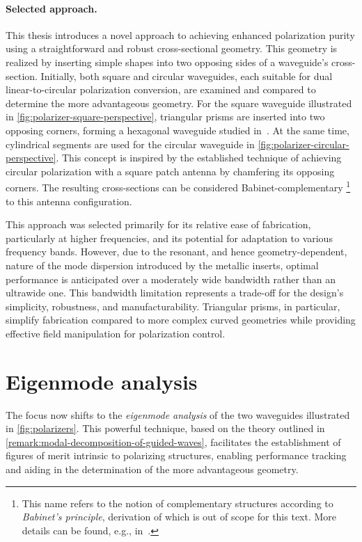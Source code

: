 \documentclass[11pt,a4paper,twoside,openany]{report}
\begin{document}
\paragraph{Selected approach.} This thesis introduces a novel approach to achieving enhanced polarization purity using a straightforward and robust cross-sectional geometry. This geometry is realized by inserting simple shapes into two opposing sides of a waveguide's cross-section. Initially, both square and circular waveguides, each suitable for dual linear-to-circular polarization conversion, are examined and compared to determine the more advantageous geometry. For the square waveguide illustrated in \cref{fig:polarizer-square-perspective}, triangular prisms are inserted into two opposing corners, forming a hexagonal waveguide studied in~\parencite{bhardwaj-volakis:hexagonal-waveguides-new-class-of-waveguides-for-mmwave-circularly-polarized-horns}. At the same time, cylindrical segments are used for the circular waveguide in \cref{fig:polarizer-circular-perspective}. This concept is inspired by the established technique of achieving circular polarization with a square patch antenna by chamfering its opposing corners. The resulting cross-sections can be considered Babinet-complementary%
    \footnote{This name refers to the notion of complementary structures according to \emph{Babinet's principle}, derivation of which is out of scope for this text. More details can be found, e.g., in~\parencite{born-wolf:principles-of-optics}.}
to this antenna configuration.

This approach was selected primarily for its relative ease of fabrication, particularly at higher frequencies, and its potential for adaptation to various frequency bands. However, due to the resonant, and hence geometry-dependent, nature of the mode dispersion introduced by the metallic inserts, optimal performance is anticipated over a moderately wide bandwidth rather than an ultrawide one. This bandwidth limitation represents a trade-off for the design's simplicity, robustness, and manufacturability. Triangular prisms, in particular, simplify fabrication compared to more complex curved geometries while providing effective field manipulation for polarization control.

\section{Eigenmode analysis}
The focus now shifts to the \emph{eigenmode analysis} of the two waveguides illustrated in \cref{fig:polarizers}. This powerful technique, based on the theory outlined in \cref{remark:modal-decomposition-of-guided-waves}, facilitates the establishment of figures of merit intrinsic to polarizing structures, enabling performance tracking and aiding in the determination of the more advantageous geometry.
\end{document}
